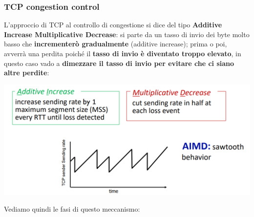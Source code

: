 \documentclass[12pt]{article}
\begin{document}
\subsubsection{TCP congestion control}
L'approccio di TCP al controllo di congestione si dice del tipo \textbf{Additive Increase Multiplicative Decrease}: si parte da un tasso di invio dei byte
molto basso che \textbf{incrementerò gradualmente} (additive increase); prima o poi, avverrà una perdita poiché il \textbf{tasso di invio è diventato troppo elevato}, in questo caso
vado a \textbf{dimezzare il tasso di invio per evitare che ci siano altre perdite}:
\begin{center}
    \includegraphics[width = 0.85\linewidth]{Images/69.png}
\end{center}
Vediamo quindi le fasi di questo meccanismo:
\end{document}
